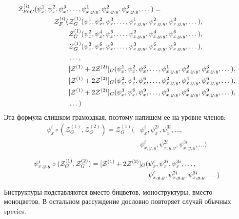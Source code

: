 \begin{theorem}
\begin{equation}
\begin{split}
\label{eq:h-zfg}
	\mathcal Z^{(i)}_{F \circ G} (\psi_x^1, \psi_x^2, \psi_x^3, &\dots, 
	\psi_{x,y,y}^1, \psi_{x,y,y}^2, \psi_{x,y,y}^3, \dots) = \\
	\mathcal Z_F^{(i)}(
		&\mathcal Z^{(1)}_G(\psi_x^1, \psi_x^2, \psi_x^3, \dots, 
					 \psi_{x, y, y}^1, \psi_{x, y, y}^2, \psi_{x, y, y}^3, \dots), \\
		&\mathcal Z^{(1)}_G(\psi_x^2, \psi_x^4, \psi_x^6, \dots, 
					 \psi_{x, y, y}^2, \psi_{x, y, y}^4, \psi_{x, y, y}^6, \dots), \\
		&\mathcal Z^{(1)}_G(\psi_x^3, \psi_x^6, \psi_x^9, \dots, 
					 \psi_{x, y, y}^3, \psi_{x, y, y}^6, \psi_{x, y, y}^9, \dots), \\
		&\dots, \\
		&[\mathcal Z^{(1)} + 2\mathcal Z^{(2)}]_G(\psi_x^1, \psi_x^2, \psi_x^3, \dots, 
					 \psi_{x,y,y}^1, \psi_{x,y,y}^2, \psi_{x,y,y}^3, \dots), \\
		&[\mathcal Z^{(1)} + 2\mathcal Z^{(2)}]_G(\psi_x^2, \psi_x^4, \psi_x^6, \dots, 
					 \psi_{x,y,y}^2, \psi_{x,y,y}^4, \psi_{x,y,y}^6, \dots), \\
		&[\mathcal Z^{(1)} + 2\mathcal Z^{(2)}]_G(\psi_x^3, \psi_x^6, \psi_x^9, \dots, 
					 \psi_{x,y,y}^3, \psi_{x,y,y}^6, \psi_{x,y,y}^9, \dots), \\
		&\dots
	)
\end{split}	
\end{equation}
Эта формула слишком грамоздкая, поэтому напишем ее на уровне членов:
\begin{equation*}
\begin{split}
\psi_x^i \circ (\mathcal Z^{(1)}_G, \mathcal Z^{(2)}_G ) = \mathcal Z^{(1)}_G
(&\psi_x^i, \psi_x^{2i}, \psi_x^{3i}, \dots, \\
&\psi_{x,y,y}^i, \psi_{x,y,y}^{2i}, \psi_{x,y,y}^{3i}, \dots)
\end{split}
\end{equation*}

\begin{equation*}
\begin{split}
\psi_{x,y,y}^i \circ (\mathcal Z^{(1)}_G, \mathcal Z^{(2)}_G ) = [\mathcal Z^{(1)} + 2\mathcal Z^{(2)}]_G
(&\psi_x^i, \psi_x^{2i}, \psi_x^{3i}, \dots, \\
&\psi_{x,y,y}^i, \psi_{x,y,y}^{2i}, \psi_{x,y,y}^{3i}, \dots)
\end{split}
\end{equation*}
\end{theorem}
Биструктуры подставляются вместо бицветов, моноструктуры, вместо моноцветов. В
остальном рассуждение дословно повторяет случай обычных species.

